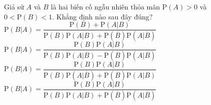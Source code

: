 \begin{ex}%
	Giả sử $A$ và $B$ là  hai biến cố ngẫu nhiên thỏa mãn $\mathrm{P}\left(A\right)>0$ và $0<\mathrm{P}\left(B\right)<1$. Khẳng định nào sau đây đúng?
	\choice 
		 {$\mathrm{P}\left(B|A\right)=\dfrac{\mathrm{P}\left(B\right)+\mathrm{P}\left(A|B\right)}{\mathrm{P}\left(B\right)\mathrm{P}\left(A|B\right)+\mathrm{P}\left(\overline{B}\right)\mathrm{P}\left(A|\overline{B}\right)}$}
		{$\mathrm{P}\left(B|A\right)=\dfrac{\mathrm{P}\left(B\right)\mathrm{P}\left(A|B\right)}{\mathrm{P}\left(B\right)\mathrm{P}\left(A|B\right)-\mathrm{P}\left(\overline{B}\right)\mathrm{P}\left(A|\overline{B}\right)}$} 
		 {$\mathrm{P}\left(B|A\right)=\dfrac{\mathrm{P}\left(B\right)\mathrm{P}\left(A|B\right)}{\mathrm{P}\left(B\right)\mathrm{P}\left(A|\overline{B}\right)+\mathrm{P}\left(\overline{B}\right)\mathrm{P}\left(A|B\right)}$}
		 {\True $\mathrm{P}\left(B|A\right)=\dfrac{\mathrm{P}\left(B\right)\mathrm{P}\left(A|B\right)}{\mathrm{P}\left(B\right)\mathrm{P}\left(A|B\right)+\mathrm{P}\left(\overline{B}\right)\mathrm{P}\left(A|\overline{B}\right)}$}
\end{ex}

